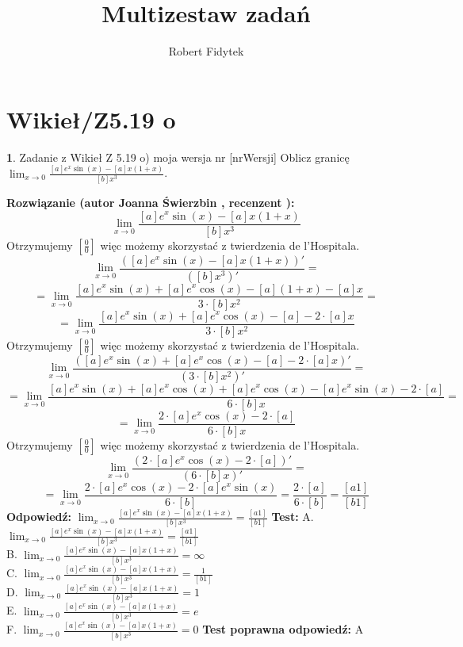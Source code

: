 \documentclass[12pt, a4paper]{article}
\title{Multizestaw zadań}
\author{Robert Fidytek}
\date{}
\theoremstyle{definition} %
\newtheorem{zad}{}
\newcommand{\kategoria}[1]{\section{#1}} %
\newcommand{\zadStart}[1]{\begin{zad}#1\newline} %
\newcommand{\zadStop}{\end{zad}}   %
\newcommand{\rozwStart}[2]{\noindent \textbf{Rozwiązanie (autor #1 , recenzent #2): }\newline} %
\newcommand{\rozwStop}{\newline}                                            %
\newcommand{\odpStart}{\noindent \textbf{Odpowiedź:}\newline}    %
\newcommand{\odpStop}{\newline}                                             %
\newcommand{\testStart}{\noindent \textbf{Test:}\newline} %
\newcommand{\testStop}{\newline} %
\newcommand{\kluczStart}{\noindent \textbf{Test poprawna odpowiedź:}\newline} %
\newcommand{\kluczStop}{\newline} %
\begin{document}
\maketitle


\kategoria{Wikieł/Z5.19 o}
\zadStart{Zadanie z Wikieł Z 5.19 o) moja wersja nr [nrWersji]}
Oblicz granicę $\lim_{x \rightarrow 0} \frac{[a]e^x\sin(x)-[a]x(1+x)}{[b]x^3}$.
\zadStop
\rozwStart{Joanna Świerzbin}{}
$$ \lim_{x \rightarrow 0} \frac{[a]e^x\sin(x)-[a]x(1+x)}{[b]x^3}$$
Otrzymujemy $ \left[ \frac{0}{0} \right] $ więc możemy skorzystać z twierdzenia de l'Hospitala.
$$ \lim_{x \rightarrow 0} \frac{\left([a]e^x\sin(x)-[a]x(1+x)\right)'}{\left([b]x^3\right)'}=$$
$$= \lim_{x \rightarrow 0} \frac{[a]e^x\sin(x)+[a]e^x\cos(x)-[a](1+x)-[a]x}{3\cdot[b]x^2}=$$
$$= \lim_{x \rightarrow 0} \frac{[a]e^x\sin(x)+[a]e^x\cos(x)-[a]-2\cdot[a]x}{3\cdot[b]x^2}$$
Otrzymujemy $ \left[ \frac{0}{0} \right] $ więc możemy skorzystać z twierdzenia de l'Hospitala.
$$\lim_{x \rightarrow 0} \frac{\left([a]e^x\sin(x)+[a]e^x\cos(x)-[a]-2\cdot[a]x\right)'}{\left(3\cdot[b]x^2\right)'}=$$
$$=\lim_{x \rightarrow 0} \frac{[a]e^x\sin(x)+[a]e^x\cos(x)+[a]e^x\cos(x)-[a]e^x\sin(x)-2\cdot[a]}{6\cdot[b]x}=$$
$$=\lim_{x \rightarrow 0} \frac{2\cdot[a]e^x\cos(x)-2\cdot[a]}{6\cdot[b]x}$$
Otrzymujemy $ \left[ \frac{0}{0} \right] $ więc możemy skorzystać z twierdzenia de l'Hospitala.
$$\lim_{x \rightarrow 0} \frac{\left(2\cdot[a]e^x\cos(x)-2\cdot[a]\right)'}{\left(6\cdot[b]x\right)'}=$$
$$=\lim_{x \rightarrow 0} \frac{2\cdot[a]e^x\cos(x)-2\cdot[a]e^x\sin(x)}{6\cdot[b]}=\frac{2\cdot[a]}{6\cdot[b]} = \frac{[a1]}{[b1]} $$
\rozwStop
\odpStart
$\lim_{x \rightarrow 0} \frac{[a]e^x\sin(x)-[a]x(1+x)}{[b]x^3} =  \frac{[a1]}{[b1]} $
\odpStop
\testStart
A. $\lim_{x \rightarrow 0} \frac{[a]e^x\sin(x)-[a]x(1+x)}{[b]x^3} =  \frac{[a1]}{[b1]} $\\
B. $\lim_{x \rightarrow 0} \frac{[a]e^x\sin(x)-[a]x(1+x)}{[b]x^3} =  \infty $\\
C. $\lim_{x \rightarrow 0} \frac{[a]e^x\sin(x)-[a]x(1+x)}{[b]x^3} =  \frac{1}{[b1]} $\\
D. $\lim_{x \rightarrow 0} \frac{[a]e^x\sin(x)-[a]x(1+x)}{[b]x^3} =  1 $\\
E. $\lim_{x \rightarrow 0} \frac{[a]e^x\sin(x)-[a]x(1+x)}{[b]x^3} =  e $\\
F. $\lim_{x \rightarrow 0} \frac{[a]e^x\sin(x)-[a]x(1+x)}{[b]x^3} =  0 $
\testStop
\kluczStart
A
\kluczStop
\end{document}
